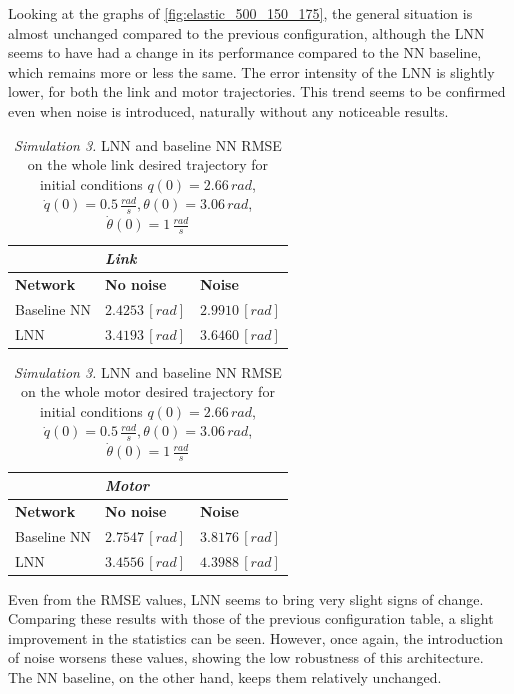 \documentclass[a4paper]{article}
\begin{document}
Looking at the graphs of \ref{fig:elastic_500_150_175}, the general situation is almost unchanged compared to the previous configuration, although the LNN seems to have had a change in its performance compared to the NN baseline, which remains more or less the same. The error intensity of the LNN is slightly lower, for both the link and motor trajectories. This trend seems to be confirmed even when noise is introduced, naturally without any noticeable results.\\

\begin{table}
    \centering
    \caption{\textit{Simulation 3.} LNN and baseline NN RMSE on the whole link desired trajectory for initial conditions $q(0)=2.66\, rad$, $\dot{q}(0)=0.5\, \frac{rad}{s}, \theta(0)=3.06\, rad$, $\dot{\theta}(0)=1\, \frac{rad}{s}$}
    \begin{tabular}{P{2.5cm}P{2.5cm}P{2.5cm}} 
    \hline\hline
    &\textit{Link}&\\
    \hline
    \textbf{Network} & \textbf{No noise} & \textbf{Noise} \\ 
    \hline
     Baseline NN & $2.4253\, [rad]$ & $2.9910\, [rad]$\\
    \hline
     LNN & $3.4193\, [rad]$& $3.6460\, [rad]$\\
    \hline\hline
    \end{tabular}
    \label{tab:elastic_link_rmse_500_1}    
\end{table}

\begin{table}
    \centering
    \caption{\textit{Simulation 3.} LNN and baseline NN RMSE on the whole motor desired trajectory for initial conditions $q(0)=2.66\, rad$, $\dot{q}(0)=0.5\, \frac{rad}{s}, \theta(0)=3.06\, rad$, $\dot{\theta}(0)=1\, \frac{rad}{s}$}
    \begin{tabular}{P{2.5cm}P{2.5cm}P{2.5cm}} 
    \hline\hline
    &\textit{Motor}&\\
    \hline
    \textbf{Network} & \textbf{No noise} & \textbf{Noise} \\ 
    \hline
     Baseline NN & $2.7547\, [rad]$ & $3.8176\, [rad]$\\
    \hline
     LNN & $3.4556\, [rad]$& $4.3988\, [rad]$\\
    \hline\hline
    \end{tabular}
    \label{tab:elastic_motor_rmse_500_1}    
\end{table}

Even from the RMSE values, LNN seems to bring very slight signs of change. Comparing these results with those of the previous configuration table, a slight improvement in the statistics can be seen. However, once again, the introduction of noise worsens these values, showing the low robustness of this architecture. The NN baseline, on the other hand, keeps them relatively unchanged.\\
\end{document}
